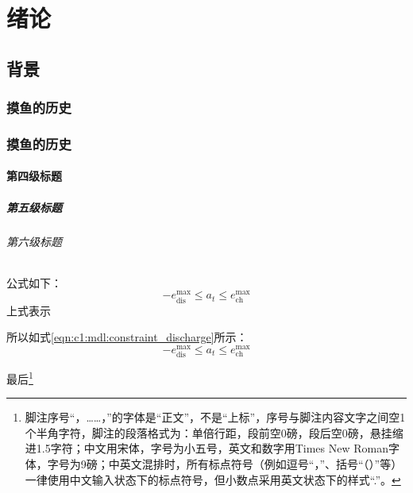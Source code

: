 \chapter{绪论}

\section{背景}

\zhlipsum[11]

\subsection{摸鱼的历史}

\zhlipsum[12]

\subsection{摸鱼的历史}


\subsubsection{第四级标题}

\paragraph{第五级标题}

\subparagraph{第六级标题}



公式如下：
\begin{equation}\label{eqn:c1:mdl:constraint_discharge}
    -e^{\max}_\text{dis} \leq a_t \leq e^{\max}_\text{ch}
\end{equation}
上式表示

所以如式\eqref{eqn:c1:mdl:constraint_discharge}所示：
\begin{equation}
    -e^{\max}_\text{dis} \leq a_t \leq e^{\max}_\text{ch}
\end{equation}

最后\footnote{脚注序号“，……，”的字体是“正文”，不是“上标”，序号与脚注内容文字之间空1个半角字符，脚注的段落格式为：单倍行距，段前空0磅，段后空0磅，悬挂缩进1.5字符；中文用宋体，字号为小五号，英文和数字用Times New Roman字体，字号为9磅；中英文混排时，所有标点符号（例如逗号“，”、括号“（）”等）一律使用中文输入状态下的标点符号，但小数点采用英文状态下的样式“.”。}

